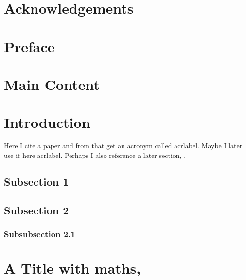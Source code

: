 \documentclass[12pt]{article}
\begin{document}
\section*{Acknowledgements}\label{Acknowledgements}
\vspace{2em}

\section*{Preface}\label{Preface}
\vspace{2em}
\blindtext


\newpage
{}
\section*{Main Content}%


\section{Introduction} \label{Sec: Introduction}
Here I cite a paper \cite{Example_Reference} and from that get an acronym called \acrfull{acrlabel}. Maybe I later use it here \ac{acrlabel}. Perhaps I also reference a later section, \secref{\ref{Sec: A Title with Maths}}.


\subsection{Subsection 1}
\blindtext

\subsection{Subsection 2}
\blindtext

\subsubsection{Subsubsection 2.1}


\section{A Title with maths, }\label{Sec: A Title with Maths}
\end{document}
